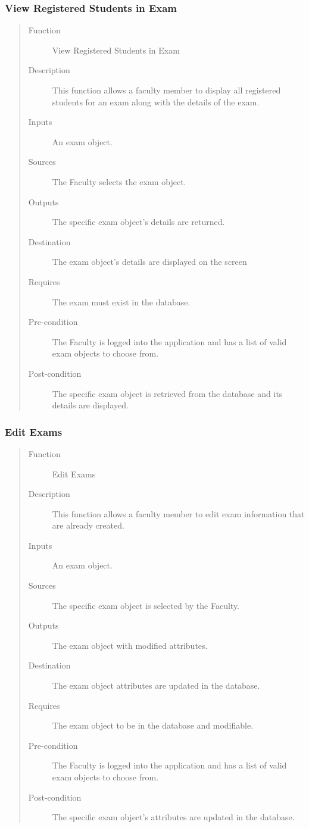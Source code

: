 \subsubsection{View Registered Students in Exam} 
\begin{quote} %
\begin{description}
\item[Function]
   View Registered Students in Exam
\item[Description]
   This function allows a faculty member to display all registered students for
   an exam along with the details of the exam.
\item[Inputs]
   An exam object.
\item[Sources]
   The Faculty selects the exam object.
\item[Outputs]
   The specific exam object's details are returned.
\item[Destination]
   The exam object's details are displayed on the screen
\item[Requires]
   The exam must exist in the database.
\item[Pre-condition]
   The Faculty is logged into the application and has a list of valid exam objects
   to choose from.
\item[Post-condition]
   The specific exam object is retrieved from the database and its details are
   displayed.
\end{description}
\end{quote} %

\subsubsection{Edit Exams} 
\begin{quote} %
\begin{description}
\item[Function]
   Edit Exams
\item[Description]
   This function allows a faculty member to edit exam information that are
   already created.
\item[Inputs]
   An exam object.
\item[Sources]
   The specific exam object is selected by the Faculty.
\item[Outputs]
   The exam object with modified attributes.
\item[Destination]
   The exam object attributes are updated in the database.
\item[Requires]
   The exam object to be in the database and modifiable.
\item[Pre-condition]
   The Faculty is logged into the application and has a list of valid exam objects
   to choose from.
\item[Post-condition]
   The specific exam object's attributes are updated in the database.
\end{description}
\end{quote} %

